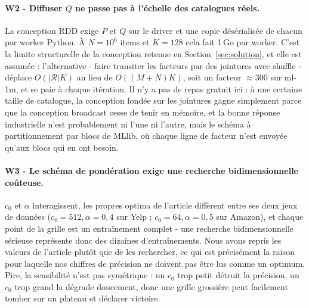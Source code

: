 \paragraph{W2 - Diffuser $Q$ ne passe pas à l'échelle des catalogues réels.} La
conception RDD exige $P$ et $Q$ sur le driver et une copie désérialisée de chacun par
worker Python. À $N=10^6$ items et $K=128$ cela fait 1\,Go par worker. C'est la limite
structurelle de la conception retenue en Section~\ref{sec:solution}, et elle est
assumée : l'alternative - faire transiter les facteurs par des jointures avec
shuffle - déplace $O(|\mathcal{R}|K)$ au lieu de $O((M+N)K)$, soit un facteur
$\approx 300$ sur ml-1m, et se paie à chaque itération. Il n'y a pas de repas gratuit
ici : à une certaine taille de catalogue, la conception fondée sur les jointures gagne
simplement parce que la conception broadcast cesse de tenir en mémoire, et la bonne
réponse industrielle n'est probablement ni l'une ni l'autre, mais le schéma à
partitionnement par blocs de MLlib, où chaque ligne de facteur n'est envoyée qu'aux
blocs qui en ont besoin.

\paragraph{W3 - Le schéma de pondération exige une recherche bidimensionnelle
coûteuse.} $c_0$ et $\alpha$ interagissent, les propres optima de l'article diffèrent
entre ses deux jeux de données ($c_0=512,\alpha=0,4$ sur Yelp ; $c_0=64,\alpha=0,5$
sur Amazon), et chaque point de la grille est un entraînement complet - une
recherche bidimensionnelle sérieuse représente donc des dizaines d'entraînements. Nous
avons repris les valeurs de l'article plutôt que de les rechercher, ce qui est
précisément la raison pour laquelle nos chiffres de précision ne doivent pas être lus
comme un optimum. Pire, la sensibilité n'est pas symétrique : un $c_0$ trop petit
détruit la précision, un $c_0$ trop grand la dégrade doucement, donc une grille
grossière peut facilement tomber sur un plateau et déclarer victoire.

